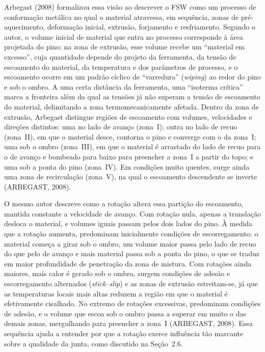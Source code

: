\documentclass[12pt,openany]{report}
\begin{document}
Arbegast (2008) formalizou essa visão ao descrever o FSW como um processo de conformação metálica no qual o material atravessa, em sequência, zonas de pré-aquecimento, deformação inicial, extrusão, forjamento e resfriamento. Segundo o autor, o volume inicial de material que entra no processo corresponde à área projetada do pino; na zona de extrusão, esse volume recebe um ``material em excesso'', cuja quantidade depende do projeto da ferramenta, da tensão de escoamento do material, da temperatura e dos parâmetros de processo, e o escoamento ocorre em um padrão cíclico de ``varredura'' (\textit{wiping}) ao redor do pino e sob o ombro. A uma certa distância da ferramenta, uma ``isoterma crítica'' marca a fronteira além da qual as tensões já não superam a tensão de escoamento do material, delimitando a zona termomecanicamente afetada. Dentro da zona de extrusão, Arbegast distingue regiões de escoamento com volumes, velocidades e direções distintos: uma no lado de avanço (zona~I); outra no lado de recuo (zona~II), em que o material desce, contorna o pino e converge com o da zona~I; uma sob o ombro (zona~III), em que o material é arrastado do lado de recuo para o de avanço e bombeado para baixo para preencher a zona~I a partir do topo; e uma sob a ponta do pino (zona~IV). Em condições muito quentes, surge ainda uma zona de recirculação (zona~V), na qual o escoamento descendente se inverte (ARBEGAST, 2008).

O mesmo autor descreve como a rotação altera essa partição do escoamento, mantida constante a velocidade de avanço. Com rotação nula, apenas a translação desloca o material, e volumes iguais passam pelos dois lados do pino. À medida que a rotação aumenta, predominam inicialmente condições de escorregamento: o material começa a girar sob o ombro, um volume maior passa pelo lado de recuo do que pelo de avanço e mais material passa sob a ponta do pino, o que se traduz em maior profundidade de penetração da zona de mistura. Com rotações ainda maiores, mais calor é gerado sob o ombro, surgem condições de adesão e escorregamento alternados (\textit{stick--slip}) e as zonas de extrusão estreitam-se, já que as temperaturas locais mais altas reduzem a região em que o material é efetivamente cisalhado. No extremo de rotações excessivas, predominam condições de adesão, e o volume que escoa sob o ombro passa a superar em muito o das demais zonas, mergulhando para preencher a zona~I (ARBEGAST, 2008). Essa sequência ajuda a entender por que a rotação exerce influência tão marcante sobre a qualidade da junta, como discutido na Seção~2.6.
\end{document}

